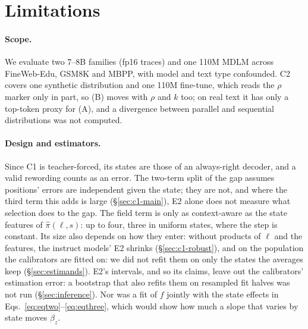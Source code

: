 
\section*{Limitations}

\paragraph{Scope.}
We evaluate two 7--8B families (fp16 traces) and one 110M MDLM across FineWeb-Edu, GSM8K and MBPP, with model and text type confounded. C2 covers one synthetic distribution and one 110M fine-tune, which reads the $\rho$ marker only in part, so (B) moves with $\rho$ and $k$ too; on real text it has only a top-token proxy for (A), and a divergence between parallel and sequential distributions was not computed.

\paragraph{Design and estimators.}
Since C1 is teacher-forced, its states are those of an always-right decoder,
and a valid rewording counts as an error.
The two-term split of the gap assumes positions' errors are independent given the state; they are not,
and where the third term this adds is large (\S\ref{sec:c1-main}), E2 alone does not measure what selection does to the gap.
The field term is only as context-aware as the state features of $\hat\pi(\ell,s)$: up
to four, three in uniform states, where the step is constant. Its size also depends on how they
enter: without products of $\ell$ and the features, the instruct models' E2 shrinks
(\S\ref{sec:c1-robust}), and on the population the calibrators are fitted on: we did not refit
them on only the states the averages keep (\S\ref{sec:estimands}). E2's intervals, and so its
claims, leave out the calibrators' estimation error: a bootstrap that also refits them on resampled
fit halves was not run (\S\ref{sec:inference}). Nor was a fit of $f$ jointly with the state effects
in Eqs.~\ref{eq:eqtwo}--\ref{eq:eqthree}, which would show how much a slope that varies by state
moves $\beta_z$.


